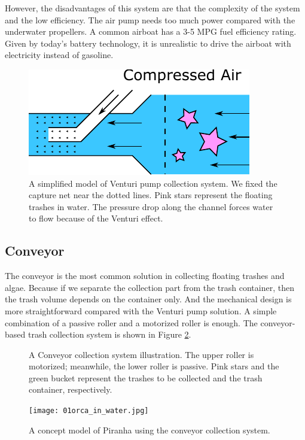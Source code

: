 However, the disadvantages of this system are that the complexity of the system and the low efficiency.  The air pump needs too much power compared with the underwater propellers. A common airboat has a 3-5 MPG fuel efficiency rating. Given by today's battery technology, it is unrealistic to drive the airboat with electricity instead of gasoline.

\begin{figure}[H]
    \centering
    \includegraphics[width=.5\textwidth]{images/01air_pump.pdf}
    \caption{A simplified model of Venturi pump collection system. We fixed the capture net near the dotted lines. Pink stars represent the floating trashes in water. The pressure drop along the channel forces water to flow because of the Venturi effect.}
    \label{fig:01air_pump}
\end{figure}

\subsection{Conveyor}

The conveyor is the most common solution in collecting floating trashes and algae. Because if we separate the collection part from the trash container, then the trash volume depends on the container only. And the mechanical design is more straightforward compared with the Venturi pump solution. A simple combination of a passive roller and a motorized roller is enough. The conveyor-based trash collection system is shown in Figure \ref{fig:01conveyor}.

\begin{figure}[H]
    \centering
    \resizebox{.5\textwidth}{!}{}
    \caption{A Conveyor collection system illustration. The upper roller is motorized; meanwhile, the lower roller is passive. Pink stars and the green bucket represent the trashes to be collected and the trash container, respectively.}
    \label{fig:01conveyor}
\end{figure}

\begin{figure}[H]
    \centering
    \texttt{[image: 01orca\_in\_water.jpg]}
    \caption{A concept model of Piranha using the conveyor collection system.}
    \label{fig:01orca_in_water}
\end{figure}


